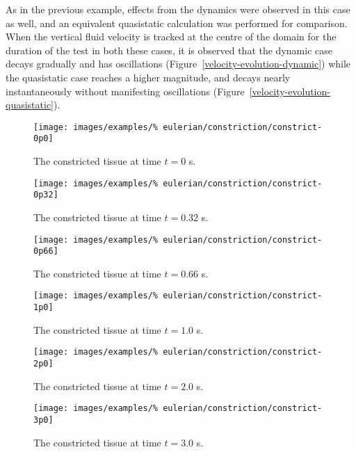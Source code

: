 As in the previous example, effects from the dynamics were observed in
this case as well, and an equivalent quasistatic calculation was
performed for comparison. When the vertical fluid velocity is tracked
at the centre of the domain for the duration of the test in both these
cases, it is observed that the dynamic case decays gradually and has
oscillations (Figure~\ref{velocity-evolution-dynamic}) while the
quasistatic case reaches a higher magnitude, and decays nearly
instantaneously without manifesting oscillations
(Figure~\ref{velocity-evolution-quasistatic}).

\begin{figure}[!hptb]
\centering
\texttt{[image: images/examples/\%
eulerian/constriction/constrict-0p0]}
\caption{The constricted tissue at time $t=0$ s.} 
\label{constrict-image-0p0}
\end{figure}

\begin{figure}[!hptb]
\centering
\texttt{[image: images/examples/\%
eulerian/constriction/constrict-0p32]}
\caption{The constricted tissue at time $t=0.32$ s.} 
\label{constrict-image-0p32}
\end{figure}

\begin{figure}[!hptb]
\centering
\texttt{[image: images/examples/\%
eulerian/constriction/constrict-0p66]}
\caption{The constricted tissue at time $t=0.66$ s.} 
\label{constrict-image-0p66}
\end{figure}

\begin{figure}[!hptb]
\centering
\texttt{[image: images/examples/\%
eulerian/constriction/constrict-1p0]}
\caption{The constricted tissue at time $t=1.0$ s.} 
\label{constrict-image-1p0}
\end{figure}

\begin{figure}[!hptb]
\centering
\texttt{[image: images/examples/\%
eulerian/constriction/constrict-2p0]}
\caption{The constricted tissue at time $t=2.0$ s.} 
\label{constrict-image-2p0}
\end{figure}

\begin{figure}[!hptb]
\centering
\texttt{[image: images/examples/\%
eulerian/constriction/constrict-3p0]}
\caption{The constricted tissue at time $t=3.0$ s.} 
\label{constrict-image-3p0}
\end{figure}

